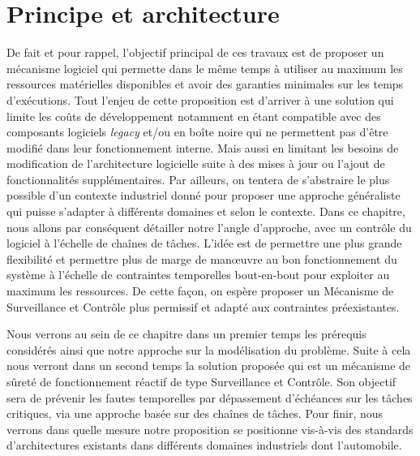 \documentclass[french, a4paper, 11pt, twoside, pdftex]{StyleThese}
\begin{document}
\setcounter{chapter}{3} %
\dominitoc
\faketableofcontents
\fi

\chapter{Principe et architecture} \label{chap:3_PrincipeArchi}
\minitoc

De fait et pour rappel, l'objectif principal de ces travaux est de proposer un mécanisme logiciel qui permette dans le même temps à utiliser au maximum les ressources matérielles disponibles et avoir des garanties minimales sur les temps d'exécutions. Tout l'enjeu de cette proposition est d'arriver à une solution qui limite les coûts de développement notamment en étant compatible avec des composants logiciels \textit{legacy} et/ou en boîte noire qui ne permettent pas d'être modifié dans leur fonctionnement interne. Mais aussi en limitant les besoins de modification de l'architecture logicielle suite à des mises à jour ou l'ajout de fonctionnalités supplémentaires. Par ailleurs, on tentera de s'abstraire le plus possible d'un contexte industriel donné pour proposer une approche généraliste qui puisse s'adapter à différents domaines et selon le contexte.
Dans ce chapitre, nous allons par conséquent détailler notre l'angle d'approche, avec un contrôle du logiciel à l'échelle de chaînes de tâches. L'idée est de permettre une plus grande flexibilité et permettre plus de marge de manœuvre au bon fonctionnement du système à l'échelle de contraintes temporelles bout-en-bout pour exploiter au maximum les ressources. De cette façon, on espère proposer un Mécanisme de Surveillance et Contrôle plus permissif et adapté aux contraintes préexistantes.

Nous verrons au sein de ce chapitre dans un premier temps les prérequis considérés ainsi que notre approche sur la modélisation du problème. Suite à cela nous verront dans un second temps la solution proposée qui est un mécanisme de sûreté de fonctionnement réactif de type Surveillance et Contrôle. Son objectif sera de prévenir les fautes temporelles par dépassement d'échéances sur les tâches critiques, via une approche basée sur des chaînes de tâches.
Pour finir, nous verrons dans quelle mesure notre proposition se positionne vis-à-vis des standards d'architectures existants dans différents domaines industriels dont l'automobile.

\end{document}
